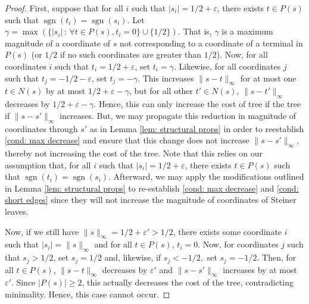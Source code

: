 \documentclass{article}\providecommand{\DeclareRedundantLanguages}[2]{}\usepackage[a4paper,margin=20mm]{geometry}
\DeclareMathOperator{\sgn}{sgn}
\newcommand{\1}{\textbf{1}}
\begin{document}
\begin{proof}
First, suppose that for all $i$ such that $|s_i| = 1/2 + \varepsilon$, there exists $t \in P(s)$ such that $\sgn(t_i) = \sgn(s_i)$. Let $\gamma = \max(\{|s_i| \,:\, \forall t \in P(s), t_i = 0\} \cup \{ 1/2\}).$ That is, $\gamma$ is a maximum magnitude of a coordinate of $s$ not corresponding to a coordinate of a terminal in $P(s)$ (or $1/2$ if no such coordinates are greater than $1/2$). Now, for all coordinates $i$ such that $t_i = 1/2 + \varepsilon$, set $t_i = \gamma$. Likewise, for all coordinates $j$ such that $t_j = - 1/2 - \varepsilon$, set $t_j = -\gamma$. This increases $\| s - t\|_{\infty}$ for at most one $t \in N(s)$ by at most $1/2 + \varepsilon - \gamma$, but for all other $t' \in N(s)$, $\| s - t'\|_{\infty}$ decreases by $1/2 + \varepsilon - \gamma$. 
Hence, this can only increase the cost of tree if the tree if $\|s - s'\|_{\infty}$ increases. But, we may propagate this reduction in magnitude of coordinates through $s'$ as in Lemma \ref{lem: structural props} in order to reestablish \ref{cond: max decrease} and ensure that this change does not increase $\|s - s'\|_{\infty}$, thereby not increasing the cost of the tree. Note that this relies on our assumption that, for all $i$ such that $|s_i| = 1/2 + \varepsilon$, there exists $t \in P(s)$ such that $\sgn(t_i) = \sgn(s_i)$. Afterward, we may apply the modifications outlined in Lemma \ref{lem: structural props} to re-establish \ref{cond: max decrease} and \ref{cond: short edges} since they will not increase the magnitude of coordinates of Steiner leaves.


Now, if we still have  $\|s\|_{\infty} = 1/2 + \varepsilon' > 1/2$, there exists some coordinate $i$ such that $|s_i| = \|s\|_{\infty}$ and for all $t \in P(s)$, $t_i = 0$. Now, for coordinates $j$ such that $s_j > 1/2$, set $s_j = 1/2$ and, likewise, if $s_j < -1/2,$ set $s_j = -1/2$. Then, for all $t \in P(s)$, $\|s - t\|_{\infty}$ decreases by $\varepsilon'$ and $\|s - s'\|_{\infty}$ increases by at most $\varepsilon'$. Since $|P(s)| \geq 2$, this actually decreases the cost of the tree, contradicting minimality. Hence, this case cannot occur.





\end{proof}
\end{document}
